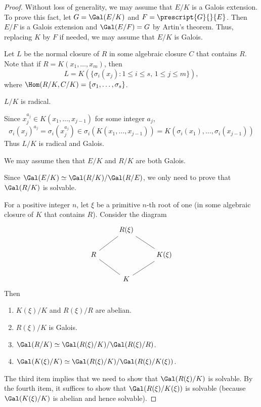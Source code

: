 \begin{proof}
    Without loss of generality, 
    we may assume that $E/K$ is a Galois extension. To prove this fact, 
    let $G=\Gal(E/K)$ and $F=\prescript{G}{}{E}$. Then
    $E/F$ is a Galois extension and $\Gal(E/F)=G$ by Artin's theorem. 
    Thus, replacing $K$ by $F$ if needed, we may assume that
    $E/K$ is Galois. 
    
    Let $L$ be the normal closure of $R$ in some
    algebraic closure $C$ that contains $R$. Note that 
    if $R=K(x_1,\dots,x_m)$, then 
    \[
    L=K(\{\sigma_i(x_j):1\leq i\leq s,\,1\leq j\leq m\}),
    \]
    where $\Hom(R/K,C/K)=\{\sigma_1,\dots,\sigma_s\}$. 
    
    \begin{claim}
        $L/K$ is radical. 
    \end{claim}
    
    Since $x_j^{a_j}\in K(x_1,\dots,x_{j-1})$ for some integer $a_j$, 
    \[
    \sigma_i(x_j)^{a_j}=\sigma_i\left(x_j^{a_j}\right)\in\sigma_i(K(x_1,\dots,x_{j-1}))=K(\sigma_i(x_1),\dots,\sigma_i(x_{j-1}))
    \]
    Thus $L/K$ is radical and Galois. 
    
    We may assume then that $E/K$ and $R/K$ are both Galois. 
    
    Since $\Gal(E/K)\simeq\Gal(R/K)/\Gal(R/E)$, we only need
    to prove that $\Gal(R/K)$ is solvable. 
    
    For a positive integer $n$, 
    let $\xi$ be a primitive $n$-th root of one (in some algebraic closure
    of $K$ that contains $R$). Consider the diagram
    \[
    \begin{tikzcd}
	& {R(\xi)} \\
	R && {K(\xi)} \\
	& K
	\arrow[no head, from=1-2, to=2-3]
	\arrow[no head, from=1-2, to=2-1]
	\arrow[no head, from=2-1, to=3-2]
	\arrow[no head, from=3-2, to=2-3]
    \end{tikzcd}
    \]
    Then
    \begin{enumerate}
        \item $K(\xi)/K$ and $R(\xi)/R$ are abelian.
        \item $R(\xi)/K$ is Galois.
        \item $\Gal(R/K)\simeq\Gal(R(\xi)/K)/\Gal(R(\xi)/R)$. 
        \item $\Gal(K(\xi)/K)\simeq\Gal(R(\xi)/K)/\Gal(R(\xi)/K(\xi))$. 
    \end{enumerate}
    The third item implies that we need to 
    show that $\Gal(R(\xi)/K)$ is solvable. By the fourth item,
    it suffices to show that $\Gal(R(\xi)/K(\xi))$ is solvable (because $\Gal(K(\xi)/K)$ is abelian and hence solvable). 
    

\end{proof}
